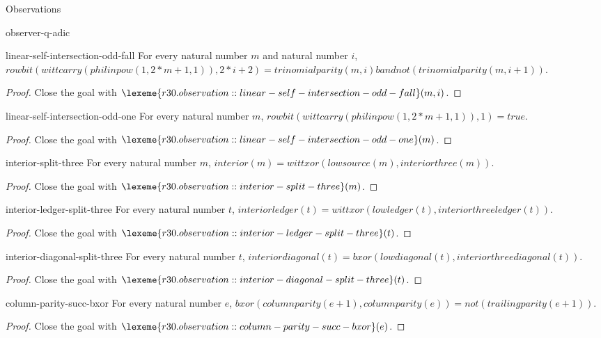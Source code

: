 \begin{lexlean}{Observations}
\begin{section}{observer-q-adic}
\begin{theorem}{linear-self-intersection-odd-fall}
For every natural number \(m\) and natural number \(i\), \(rowbit(wittcarry(philinpow(1, 2 * m + 1, 1)), 2 * i + 2) = trinomialparity(m, i) band not(trinomialparity(m, i + 1))\).
\begin{proof}
Close the goal with \(\lexeme{r30.observation::linear-self-intersection-odd-fall}(m, i)\).
\end{proof}
\end{theorem}

\begin{theorem}{linear-self-intersection-odd-one}
For every natural number \(m\), \(rowbit(wittcarry(philinpow(1, 2 * m + 1, 1)), 1) = true\).
\begin{proof}
Close the goal with \(\lexeme{r30.observation::linear-self-intersection-odd-one}(m)\).
\end{proof}
\end{theorem}

\begin{theorem}{interior-split-three}
For every natural number \(m\), \(interior(m) = wittxor(lowsource(m), interiorthree(m))\).
\begin{proof}
Close the goal with \(\lexeme{r30.observation::interior-split-three}(m)\).
\end{proof}
\end{theorem}

\begin{theorem}{interior-ledger-split-three}
For every natural number \(t\), \(interiorledger(t) = wittxor(lowledger(t), interiorthreeledger(t))\).
\begin{proof}
Close the goal with \(\lexeme{r30.observation::interior-ledger-split-three}(t)\).
\end{proof}
\end{theorem}

\begin{theorem}{interior-diagonal-split-three}
For every natural number \(t\), \(interiordiagonal(t) = bxor(lowdiagonal(t), interiorthreediagonal(t))\).
\begin{proof}
Close the goal with \(\lexeme{r30.observation::interior-diagonal-split-three}(t)\).
\end{proof}
\end{theorem}

\begin{theorem}{column-parity-succ-bxor}
For every natural number \(e\), \(bxor(columnparity(e + 1), columnparity(e)) = not(trailingparity(e + 1))\).
\begin{proof}
Close the goal with \(\lexeme{r30.observation::column-parity-succ-bxor}(e)\).
\end{proof}
\end{theorem}


\end{section}
\end{lexlean}
